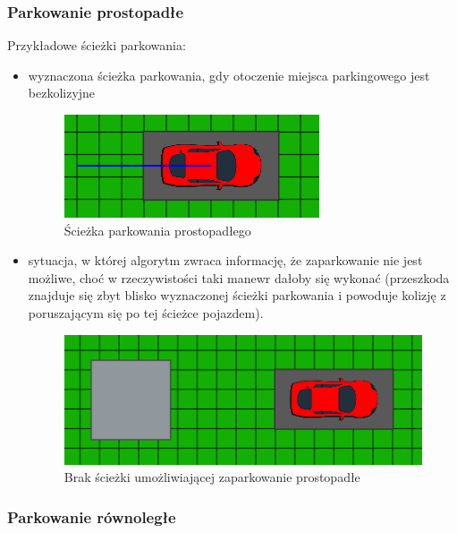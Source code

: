 \documentclass[a4paper,11pt,twoside]{report}
\theoremstyle{definition}
\begin{document}
\subsubsection{Parkowanie prostopadłe}

Przykładowe ścieżki parkowania:
\begin{itemize}
	\item wyznaczona ścieżka parkowania, gdy otoczenie miejsca parkingowego jest bezkolizyjne
	\begin{figure}[h!]
\centering
\includegraphics[scale=1.0]{parkingPathPerpendicular1}
\caption[Ścieżka parkowania prostopadłego]{Ścieżka parkowania prostopadłego}
\end{figure}
	\item sytuacja, w której algorytm zwraca informację, że zaparkowanie nie jest możliwe, choć w rzeczywistości taki manewr dałoby się wykonać (przeszkoda znajduje się zbyt blisko wyznaczonej ścieżki parkowania i powoduje kolizję z poruszającym się po tej ścieżce pojazdem).
	\begin{figure}[h!]
\centering
\includegraphics[scale=0.68]{parkingPathPerpendicular2}
\caption[Brak ścieżki umożliwiającej zaparkowanie prostopadłe]{Brak ścieżki umożliwiającej zaparkowanie prostopadłe}
\end{figure}
\end{itemize}

\subsubsection{Parkowanie równoległe}
\end{document}

